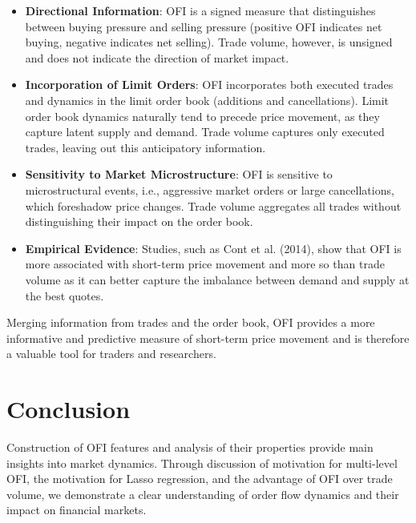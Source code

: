 \documentclass[12pt]{article}
\begin{document}
\begin{itemize}
    \item \textbf{Directional Information}: OFI is a signed measure that distinguishes between buying pressure and selling pressure (positive OFI indicates net buying, negative indicates net selling). Trade volume, however, is unsigned and does not indicate the direction of market impact.
    \item \textbf{Incorporation of Limit Orders}: OFI incorporates both executed trades and dynamics in the limit order book (additions and cancellations). Limit order book dynamics naturally tend to precede price movement, as they capture latent supply and demand. Trade volume captures only executed trades, leaving out this anticipatory information.
    \item \textbf{Sensitivity to Market Microstructure}: OFI is sensitive to microstructural events, i.e., aggressive market orders or large cancellations, which foreshadow price changes. Trade volume aggregates all trades without distinguishing their impact on the order book.
    \item \textbf{Empirical Evidence}: Studies, such as Cont et al. (2014), show that OFI is more associated with short-term price movement and more so than trade volume as it can better capture the imbalance between demand and supply at the best quotes.
\end{itemize}

Merging information from trades and the order book, OFI provides a more informative and predictive measure of short-term price movement and is therefore a valuable tool for traders and researchers.

\section{Conclusion}
Construction of OFI features and analysis of their properties provide main insights into market dynamics. Through discussion of motivation for multi-level OFI, the motivation for Lasso regression, and the advantage of OFI over trade volume, we demonstrate a clear understanding of order flow dynamics and their impact on financial markets.
\end{document}
